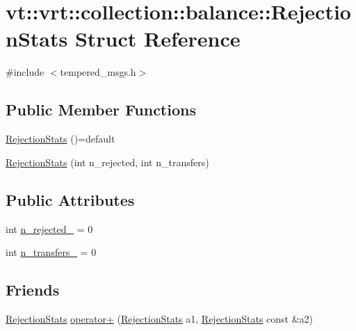 \hypertarget{structvt_1_1vrt_1_1collection_1_1balance_1_1_rejection_stats}{}\section{vt\+:\+:vrt\+:\+:collection\+:\+:balance\+:\+:Rejection\+Stats Struct Reference}
\label{structvt_1_1vrt_1_1collection_1_1balance_1_1_rejection_stats}


{\ttfamily \#include $<$tempered\+\_\+msgs.\+h$>$}

\subsection*{Public Member Functions}
\begin{DoxyCompactItemize}
\item 
\hyperlink{structvt_1_1vrt_1_1collection_1_1balance_1_1_rejection_stats_a8cb571e840ac99b47d6dfce54b8569fa}{Rejection\+Stats} ()=default
\item 
\hyperlink{structvt_1_1vrt_1_1collection_1_1balance_1_1_rejection_stats_a3a79871f2f2efe909b375a87d50281e3}{Rejection\+Stats} (int n\+\_\+rejected, int n\+\_\+transfers)
\end{DoxyCompactItemize}
\subsection*{Public Attributes}
\begin{DoxyCompactItemize}
\item 
int \hyperlink{structvt_1_1vrt_1_1collection_1_1balance_1_1_rejection_stats_a1925785748fd405e5f9062a2c38b36f6}{n\+\_\+rejected\+\_\+} = 0
\item 
int \hyperlink{structvt_1_1vrt_1_1collection_1_1balance_1_1_rejection_stats_a5cf0b43c9b564e132da0a7045ab9c865}{n\+\_\+transfers\+\_\+} = 0
\end{DoxyCompactItemize}
\subsection*{Friends}
\begin{DoxyCompactItemize}
\item 
\hyperlink{structvt_1_1vrt_1_1collection_1_1balance_1_1_rejection_stats}{Rejection\+Stats} \hyperlink{structvt_1_1vrt_1_1collection_1_1balance_1_1_rejection_stats_a363bf613ec409e35e5dd3192a9c552a3}{operator+} (\hyperlink{structvt_1_1vrt_1_1collection_1_1balance_1_1_rejection_stats}{Rejection\+Stats} a1, \hyperlink{structvt_1_1vrt_1_1collection_1_1balance_1_1_rejection_stats}{Rejection\+Stats} const \&a2)
\end{DoxyCompactItemize}


